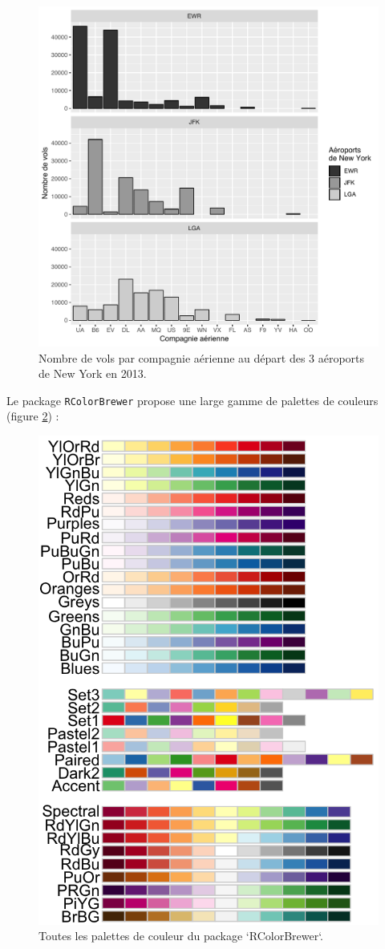 \documentclass[
  a4paper,
]{article}
\begin{document}
\begin{figure}[htpb]

{\centering \includegraphics[width=0.9\linewidth]{figure/barfacetgray-1} 

}

\caption{Nombre de vols par compagnie aérienne au départ des 3 aéroports de New York en 2013.}\label{fig:barfacetgray}
\end{figure}

Le package \texttt{RColorBrewer} propose une large gamme de palettes de couleurs (figure \ref{fig:RcolorbrewerPalettes}) :

\begin{figure}[htpb]

{\centering \includegraphics[width=0.5\linewidth]{images/brewer} 

}

\caption{Toutes les palettes de couleur du package `RColorBrewer`.}\label{fig:RcolorbrewerPalettes}
\end{figure}
\end{document}
